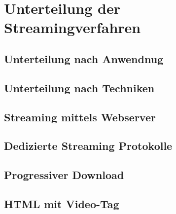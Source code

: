 \section{Unterteilung der Streamingverfahren}
\subsection{Unterteilung nach Anwendnug}
\subsection{Unterteilung nach Techniken}
\subsection{Streaming mittels Webserver}
\subsection{Dedizierte Streaming Protokolle}
\subsection{Progressiver Download}
\subsection{HTML mit Video-Tag}

